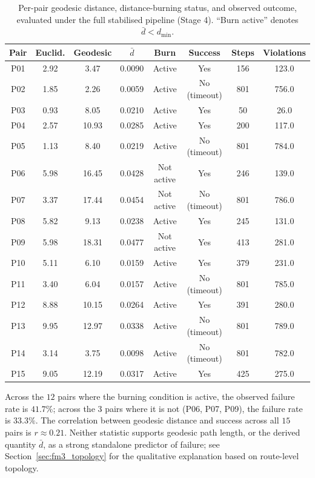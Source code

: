 \documentclass[12pt, a4paper, oneside]{report}
\theoremstyle{definition}
\begin{document}
\begin{table}[H]
\centering
\caption{Per-pair geodesic distance, distance-burning status, and
  observed outcome, evaluated under the full stabilised pipeline
  (Stage 4). ``Burn active'' denotes $\bar{d} < d_{\min}$.}
\label{tab:pairwise}
\begin{tabular}{@{}cccccccc@{}}
\toprule
\textbf{Pair} & \textbf{Euclid.} & \textbf{Geodesic} & $\bar{d}$ &
\textbf{Burn} & \textbf{Success} & \textbf{Steps} &
\textbf{Violations} \\
\midrule
P01 & 2.92 & 3.47  & 0.0090 & Active     & Yes & 156 & 123.0 \\
P02 & 1.85 & 2.26  & 0.0059 & Active     & No (timeout) & 801 & 756.0 \\
P03 & 0.93 & 8.05  & 0.0210 & Active     & Yes & 50  & 26.0  \\
P04 & 2.57 & 10.93 & 0.0285 & Active     & Yes & 200 & 117.0 \\
P05 & 1.13 & 8.40  & 0.0219 & Active     & No (timeout) & 801 & 784.0 \\
P06 & 5.98 & 16.45 & 0.0428 & Not active & Yes & 246 & 139.0 \\
P07 & 3.37 & 17.44 & 0.0454 & Not active & No (timeout) & 801 & 786.0 \\
P08 & 5.82 & 9.13  & 0.0238 & Active     & Yes & 245 & 131.0 \\
P09 & 5.98 & 18.31 & 0.0477 & Not active & Yes & 413 & 281.0 \\
P10 & 5.11 & 6.10  & 0.0159 & Active     & Yes & 379 & 231.0 \\
P11 & 3.40 & 6.04  & 0.0157 & Active     & No (timeout) & 801 & 785.0 \\
P12 & 8.88 & 10.15 & 0.0264 & Active     & Yes & 391 & 280.0 \\
P13 & 9.95 & 12.97 & 0.0338 & Active     & No (timeout) & 801 & 789.0 \\
P14 & 3.14 & 3.75  & 0.0098 & Active     & No (timeout) & 801 & 782.0 \\
P15 & 9.05 & 12.19 & 0.0317 & Active     & Yes & 425 & 275.0 \\
\bottomrule
\end{tabular}
\end{table}

Across the $12$ pairs where the burning condition is active, the
observed failure rate is $41.7\%$; across the $3$ pairs where it is
not (P06, P07, P09), the failure rate is $33.3\%$. The correlation
between geodesic distance and success across all $15$ pairs is
$r \approx 0.21$. Neither statistic supports geodesic path length,
or the derived quantity $\bar{d}$, as a strong standalone predictor
of failure; see Section~\ref{sec:fm3_topology} for the qualitative
explanation based on route-level topology.
\end{document}
